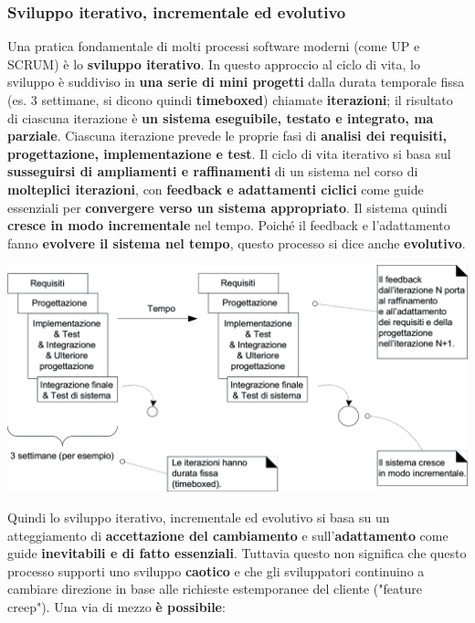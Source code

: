\documentclass[12pt]{article}
\begin{document}
\subsubsection{Sviluppo iterativo, incrementale ed evolutivo}
Una pratica fondamentale di molti processi software moderni (come UP e SCRUM) è lo \textbf{sviluppo iterativo}.
In questo approccio al ciclo di vita, lo sviluppo è suddiviso in \textbf{una serie di mini progetti} dalla durata temporale fissa (es. 3 settimane, si dicono quindi \textbf{timeboxed}) chiamate \textbf{iterazioni};
il risultato di ciascuna iterazione è \textbf{un sistema eseguibile, testato e integrato, ma parziale}. Ciascuna iterazione prevede le proprie fasi di \textbf{analisi dei requisiti, progettazione, implementazione e test}.
Il ciclo di vita iterativo si basa sul \textbf{susseguirsi di ampliamenti e raffinamenti} di un sistema nel corso di \textbf{molteplici iterazioni}, con \textbf{feedback e adattamenti ciclici} come guide essenziali per \textbf{convergere verso un sistema appropriato}.
Il sistema quindi \textbf{cresce in modo incrementale} nel tempo. Poiché il feedback e l'adattamento fanno \textbf{evolvere il sistema nel tempo}, questo processo si dice anche \textbf{evolutivo}.
\begin{center}
    \includegraphics[width = 1\textwidth]{Images/16.png}
\end{center}
Quindi lo sviluppo iterativo, incrementale ed evolutivo si basa su un atteggiamento di \textbf{accettazione del cambiamento} e sull'\textbf{adattamento} come guide \textbf{inevitabili e di fatto essenziali}.
Tuttavia questo non significa che questo processo supporti uno sviluppo \textbf{caotico} e che gli sviluppatori continuino a cambiare direzione in base alle richieste estemporanee del cliente ("feature creep"). Una via di
mezzo \textbf{è possibile}:
\end{document}

